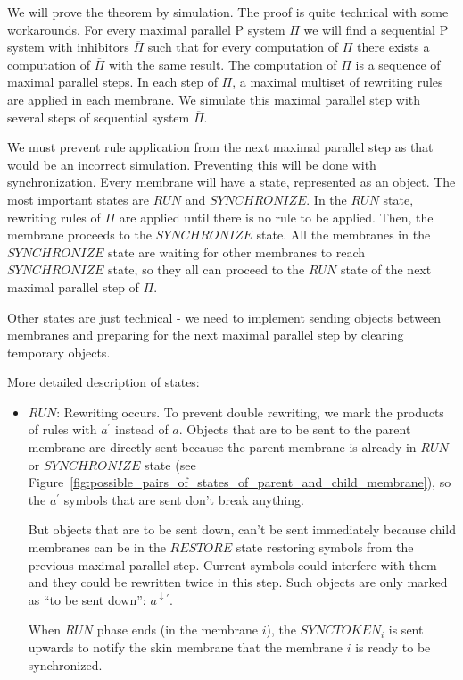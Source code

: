 \begin{dokaz}
  We will prove the theorem by simulation.
  The proof is quite technical with some workarounds.
  For every maximal parallel P system $\Pi$ we will find a sequential P system with inhibitors $\overline{\Pi}$ such that for every computation of $\Pi$ there exists a computation of $\overline{\Pi}$ with the same result.
  The computation of $\Pi$ is a sequence of maximal parallel steps.
  In each step of $\Pi$, a maximal multiset of rewriting rules are applied in each membrane.
  We simulate this maximal parallel step with several steps of sequential system $\overline{\Pi}$.

  We must prevent rule application from the next maximal parallel step as that would be an incorrect simulation.
  Preventing this will be done with synchronization.
  Every membrane will have a state, represented as an object.
  The most important states are $RUN$ and $SYNCHRONIZE$.
  In the $RUN$ state, rewriting rules of $\Pi$ are applied until there is no rule to be applied. Then, the membrane proceeds to the $SYNCHRONIZE$ state.
  All the membranes in the $SYNCHRONIZE$ state are waiting for other membranes to reach $SYNCHRONIZE$ state, so they all can proceed to the $RUN$ state of the next maximal parallel step of $\Pi$.

  Other states are just technical - we need to implement sending objects between membranes and preparing for the next maximal parallel step by clearing temporary objects.

  More detailed description of states:
  

  \begin{itemize}
    \item $RUN$: Rewriting occurs.
    To prevent double rewriting, we mark the products of rules with $a^{\prime}$ instead of $a$.
    Objects that are to be sent to the parent membrane are directly sent because the parent membrane is already in $RUN$ or $SYNCHRONIZE$ state (see Figure~\ref{fig:possible_pairs_of_states_of_parent_and_child_membrane}), so the $a^{\prime}$ symbols that are sent don't break anything.
    
    But objects that are to be sent down, can't be sent immediately because child membranes can be in the $RESTORE$ state restoring symbols from the previous maximal parallel step. Current symbols could interfere with them and they could be rewritten twice in this step. Such objects are only marked as ``to be sent down'': $a^{\downarrow\prime}$.

    When $RUN$ phase ends (in the membrane $i$), the $SYNCTOKEN_i$ is sent upwards to notify the skin membrane that the membrane $i$ is ready to be synchronized.


\end{itemize}
\end{dokaz}
